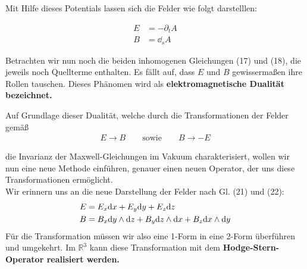 Mit Hilfe dieses Potentials lassen sich die Felder wie folgt darstelllen:

\begin{align}
E &= -\partial_t A \\
B &= \dd_s A
\end{align}

Betrachten wir nun noch die beiden inhomogenen Gleichungen (17) und (18), die jeweils noch Quellterme enthalten. Es fällt auf, dass $E$ und $B$ gewissermaßen ihre Rollen tauschen. Dieses Phänomen wird als \bfseries elektromagnetische Dualität \normalfont bezeichnet.

Auf Grundlage dieser Dualität, welche durch die Transformationen der Felder gemäß
\begin{align*}
E \rightarrow B \qquad \text{sowie} \qquad B \rightarrow -E
\end{align*}

die Invarianz der Maxwell-Gleichungen im Vakuum charakterisiert, wollen wir nun eine neue Methode einführen, genauer einen neuen Operator, der uns diese Transformationen ermöglicht. \\
Wir erinnern uns an die neue Darstellung der Felder nach Gl. (21) und (22):
\begin{align*}
E &= E_x \dd x +E_y \dd y + E_z \dd z   \\
B &= B_x \dd y \wedge \dd z + B_y \dd z \wedge \dd x + B_z \dd x \wedge \dd y 
\end{align*}
Für die Transformation müssen wir also eine 1-Form in eine 2-Form überführen und umgekehrt. Im $\mathbb{R}^3$ kann diese Transformation mit dem \bfseries Hodge-Stern-Operator \normalfont realisiert werden.

